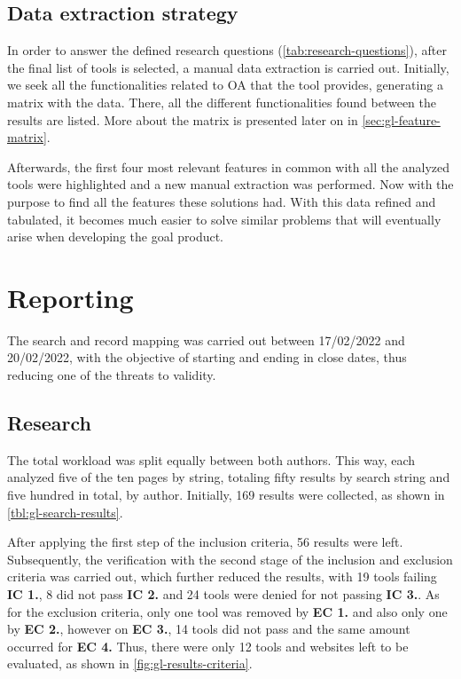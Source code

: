 

\subsection{Data extraction strategy}\label{sec:gl-planning-datastrategy}

In order to answer the defined research questions (\autoref{tab:research-questions}), after the final list of tools is selected, a manual data extraction is carried out. Initially, we seek all the functionalities related to \ac{OA} that the tool provides, generating a matrix with the data. There, all the different functionalities found between the results are listed. More about the matrix is presented later on in \autoref{sec:gl-feature-matrix}.

Afterwards, the first four most relevant features in common with all the analyzed tools were highlighted and a new manual extraction was performed. Now with the purpose to find all the features these solutions had. With this data refined and tabulated, it becomes much easier to solve similar problems that will eventually arise when developing the goal product.

\section{Reporting}\label{sec:gl-reporting}

The search and record mapping was carried out between 17/02/2022 and 20/02/2022, with the objective of starting and ending in close dates, thus reducing one of the threats to validity.

\subsection{Research}\label{sec:gl-research}

The total workload was split equally between both authors. This way, each analyzed five of the ten pages by string, totaling fifty results by search string and five hundred in total, by author. Initially, 169 results were collected, as shown in \autoref{tbl:gl-search-results}.

After applying the first step of the inclusion criteria, 56 results were left. Subsequently, the verification with the second stage of the inclusion and exclusion criteria was carried out, which further reduced the results, with 19 tools failing \textbf{IC 1.}, 8 did not pass \textbf{IC 2.} and 24 tools were denied for not passing \textbf{IC 3.}. As for the exclusion criteria, only one tool was removed by \textbf{EC 1.} and also only one by \textbf{EC 2.}, however on \textbf{EC 3.}, 14 tools did not pass and the same amount occurred for \textbf{EC 4.} Thus, there were only 12 tools and websites left to be evaluated, as shown in \autoref{fig:gl-results-criteria}.

